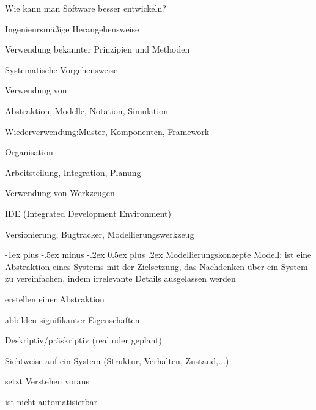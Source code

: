 \documentclass[a4paper]{article}
\makeatletter
\renewcommand{\section}{\@startsection{section}{1}{0mm}%
                                {-1ex plus -.5ex minus -.2ex}%
                                {0.5ex plus .2ex}%
                                {\normalfont\large\bfseries}}
\makeatother
\begin{document}
\raggedright
\begin{multicols}{3}\scriptsize
  \setlength{\premulticols}{1pt}
  \setlength{\postmulticols}{1pt}
  \setlength{\multicolsep}{1pt}
  \setlength{\columnsep}{2pt}

  Wie kann man Software besser entwickeln?
  \begin{itemize*}
    \item Ingenieursmäßige Herangehensweise
    \begin{itemize*}
      \item Verwendung bekannter Prinzipien und Methoden
      \item Systematische Vorgehensweise
    \end{itemize*}
    \item Verwendung von:
    \begin{itemize*}
      \item Abstraktion, Modelle, Notation, Simulation
      \item Wiederverwendung:Muster, Komponenten, Framework
    \end{itemize*}
    \item Organisation
    \begin{itemize*}
      \item Arbeitsteilung, Integration, Planung
    \end{itemize*}
    \item Verwendung von Werkzeugen
    \begin{itemize*}
      \item IDE (Integrated Development Environment)
      \item Versionierung, Bugtracker, Modellierungswerkzeug
    \end{itemize*}
  \end{itemize*}

  \section{Modellierungskonzepte}
  Modell: ist eine Abstraktion eines Systems mit der Zielsetzung, das Nachdenken über ein System zu vereinfachen, indem irrelevante Details ausgelassen werden

  \begin{itemize*}
    \item erstellen einer Abstraktion
    \item abbilden signifikanter Eigenschaften
    \item Deskriptiv/präskriptiv (real oder geplant)
    \item Sichtweise auf ein System (Struktur, Verhalten, Zustand,...)
    \item setzt Verstehen voraus
    \item ist nicht automatisierbar
  \end{itemize*}


\end{multicols}
\end{document}
